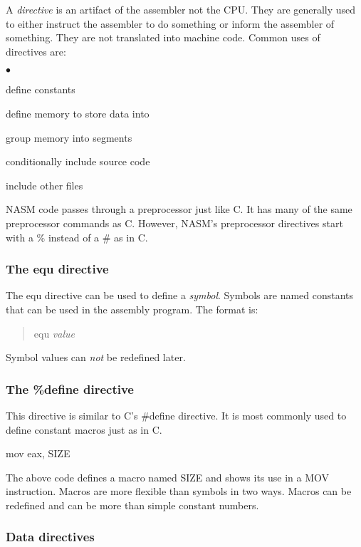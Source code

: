 A \emph{directive} is an artifact of the assembler not the CPU. They are
generally used to either instruct the assembler to do something or inform
the assembler of something. They are not translated into machine code. Common
uses of directives are:
\begin{list}{$\bullet$}{\setlength{\itemsep}{0pt}}
\item define constants
\item define memory to store data into
\item group memory into segments
\item conditionally include source code
\item include other files
\end{list}

NASM code passes through a preprocessor just like C. It has many of the
same preprocessor commands as C. However, NASM's preprocessor directives 
start with a \% instead of a \# as in C.

\subsubsection{The equ directive}

The {\code equ} directive can be used to define a \emph{symbol}. Symbols are
named constants that can be used in the assembly program. The format is:
\begin{quote}
   equ {\em value}
\end{quote}
Symbol values can \emph{not} be redefined later.

\subsubsection{The \%define directive}

This directive is similar to C's {\code \#define} directive. It is
most commonly used to define constant macros just as in C.
\begin{AsmCodeListing}[frame=none, numbers=none]
      mov    eax, SIZE
\end{AsmCodeListing}
The above code defines a macro named {\code SIZE} and shows its use in
a {\code MOV} instruction. Macros are more flexible than symbols in
two ways. Macros can be redefined and can be more than simple constant
numbers.

\subsubsection{Data directives}

